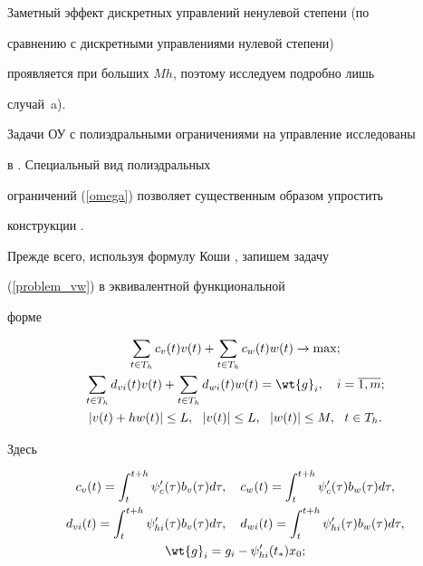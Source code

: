 




Заметный эффект дискретных управлений ненулевой степени (по


сравнению с дискретными управлениями нулевой степени)


проявляется при больших $Mh$, поэтому исследуем подробно лишь


случай~a).





Задачи ОУ с полиэдральными ограничениями на управление исследованы


в \cite{Dmitruk}. Специальный вид полиэдральных


ограничений (\ref{omega}) позволяет существенным образом упростить


конструкции \cite{Dmitruk}.





Прежде всего, используя формулу Коши \cite{OLS}, запишем задачу


(\ref{problem_vw}) в эквивалентной функциональной


форме


\begin{gather}


\sum\limits_{t \in T_h} c_v(t) v(t) + \sum\limits_{t \in T_h}


c_w(t) w(t) \to \max;\notag \\


%


\label{problem_vw_funct}


\sum\limits_{t \in T_h} d_{vi}(t) v(t) + \sum\limits_{t \in T_h}


d_{wi}(t) w(t) = \wt{g}_i, \quad i =\overline{1,m}; \\


%


|v(t) + h w(t)| \leq L, \ \ |v(t)| \leq L, \ \ |w(t)| \leq M, \ \ t \in


T_h. \notag


\end{gather}


Здесь


\begin{gather}


c_v(t) = \int_{t}^{t+h} \psi_c'(\tau) b_v(\tau) d\tau,


\quad c_w(t) = \int_{t}^{t+h} \psi_c'(\tau)


b_w(\tau) d\tau,\notag \\


%


\label{elements}


d_{vi}(t) = \int_{t}^{t+h} \psi_{hi}'(\tau) b_v(\tau)


d\tau, \quad d_{wi}(t) = \int_{t}^{t+h}


\psi_{hi}'(\tau) b_w(\tau) d\tau, \\


%


\wt{g}_i = g_i - \psi_{hi}'(t_*) x_0; \notag


\end{gather}


